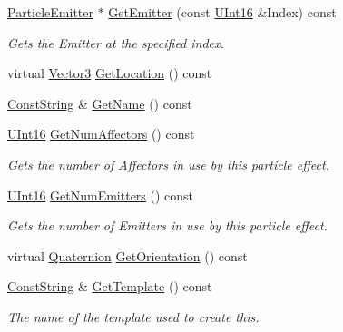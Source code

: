 \begin{DoxyCompactItemize}
\hyperlink{classMezzanine_1_1ParticleEmitter}{ParticleEmitter} $\ast$ \hyperlink{classMezzanine_1_1ParticleEffect_ada183314f9c8ed055fee5901b1d30739}{GetEmitter} (const \hyperlink{namespaceMezzanine_a1b6c09063432c7ddd87011c88306c767}{UInt16} \&Index) const 
\begin{DoxyCompactList}\small\item\em Gets the Emitter at the specified index. \item\end{DoxyCompactList}\item 
virtual \hyperlink{classMezzanine_1_1Vector3}{Vector3} \hyperlink{classMezzanine_1_1ParticleEffect_a45174a2138b031322ddc57fe1be006de}{GetLocation} () const 
\item 
\hyperlink{namespaceMezzanine_a63cd699ac54b73953f35ec9cfc05e506}{ConstString} \& \hyperlink{classMezzanine_1_1ParticleEffect_a43176eb1ad80019bc2a839e597141dd7}{GetName} () const 
\item 
\hyperlink{namespaceMezzanine_a1b6c09063432c7ddd87011c88306c767}{UInt16} \hyperlink{classMezzanine_1_1ParticleEffect_aac2469d149a5509d0f9f1486b4ca036f}{GetNumAffectors} () const 
\begin{DoxyCompactList}\small\item\em Gets the number of Affectors in use by this particle effect. \item\end{DoxyCompactList}\item 
\hyperlink{namespaceMezzanine_a1b6c09063432c7ddd87011c88306c767}{UInt16} \hyperlink{classMezzanine_1_1ParticleEffect_a7c3d466cfef8a41a63b03d3935e64f1b}{GetNumEmitters} () const 
\begin{DoxyCompactList}\small\item\em Gets the number of Emitters in use by this particle effect. \item\end{DoxyCompactList}\item 
virtual \hyperlink{classMezzanine_1_1Quaternion}{Quaternion} \hyperlink{classMezzanine_1_1ParticleEffect_ac47f0c537dd4b789c502bb2a3af61a56}{GetOrientation} () const 
\item 
\hyperlink{namespaceMezzanine_a63cd699ac54b73953f35ec9cfc05e506}{ConstString} \& \hyperlink{classMezzanine_1_1ParticleEffect_ad39ed422ad277f93a6040ad27b8b4951}{GetTemplate} () const 
\begin{DoxyCompactList}\small\item\em The name of the template used to create this. \item\end{DoxyCompactList}\item 

\end{DoxyCompactItemize}
